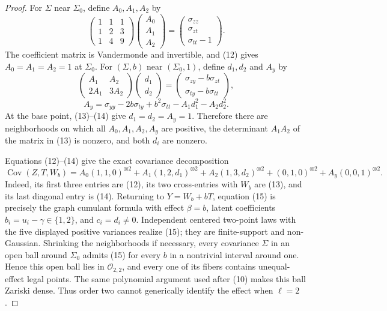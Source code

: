 \documentclass{article}
\begin{document}
\begin{proof}
For \(\Sigma\) near \(\Sigma_0\), define \(A_0,A_1,A_2\) by
\[
 \begin{pmatrix}
 1&1&1\\
 1&2&3\\
 1&4&9
 \end{pmatrix}
 \begin{pmatrix}A_0\\A_1\\A_2\end{pmatrix}
 =
 \begin{pmatrix}\sigma_{zz}\\\sigma_{zt}\\\sigma_{tt}-1\end{pmatrix}.
 \tag{12}
\]
The coefficient matrix is Vandermonde and invertible, and (12) gives \(A_0=A_1=A_2=1\) at \(\Sigma_0\).  For \((\Sigma,b)\) near \((\Sigma_0,1)\), define \(d_1,d_2\) and \(A_y\) by
\[
 \begin{pmatrix}A_1&A_2\\2A_1&3A_2\end{pmatrix}
 \begin{pmatrix}d_1\\d_2\end{pmatrix}
 =
 \begin{pmatrix}
 \sigma_{zy}-b\sigma_{zt}\\
 \sigma_{ty}-b\sigma_{tt}
 \end{pmatrix},
 \tag{13}
\]
\[
 A_y=\sigma_{yy}-2b\sigma_{ty}+b^2\sigma_{tt}
       -A_1d_1^2-A_2d_2^2.
 \tag{14}
\]
At the base point, (13)--(14) give \(d_1=d_2=A_y=1\).  Therefore there are neighborhoods on which all \(A_0,A_1,A_2,A_y\) are positive, the determinant \(A_1A_2\) of the matrix in (13) is nonzero, and both \(d_i\) are nonzero.

Equations (12)--(14) give the exact covariance decomposition
\[
 \operatorname{Cov}(Z,T,W_b)=
 A_0(1,1,0)^{\otimes2}
 +A_1(1,2,d_1)^{\otimes2}
 +A_2(1,3,d_2)^{\otimes2}
 +(0,1,0)^{\otimes2}
 +A_y(0,0,1)^{\otimes2}.
 \tag{15}
\]
Indeed, its first three entries are (12), its two cross-entries with \(W_b\) are (13), and its last diagonal entry is (14).  Returning to \(Y=W_b+bT\), equation (15) is precisely the graph cumulant formula with effect \(\beta=b\), latent coefficients \(b_i=u_i-\gamma\in\{1,2\}\), and \(c_i=d_i\ne0\).  Independent centered two-point laws with the five displayed positive variances realize (15); they are finite-support and non-Gaussian.  Shrinking the neighborhoods if necessary, every covariance \(\Sigma\) in an open ball around \(\Sigma_0\) admits (15) for every \(b\) in a nontrivial interval around one.  Hence this open ball lies in \(\mathcal O_{2,2}\), and every one of its fibers contains unequal-effect legal points.  The same polynomial argument used after (10) makes this ball Zariski dense.  Thus order two cannot generically identify the effect when \(\ell=2\).


\end{proof}
\end{document}
